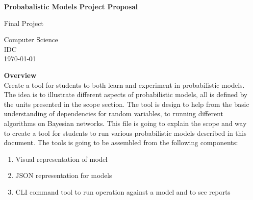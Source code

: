 \documentclass{article}
\begin{document}
    \begin{titlepage}
        \begin{center}
            \vspace*{1cm}
            
            \textbf{Probabalistic Models Project Proposal}
            
            \vspace{0.5cm}
            
            
            \vspace{1.5cm}
            
            \vfill
            
            Final Project\\
            
            \vspace{0.8cm}
            
            
            
            Computer Science\\
            IDC\\
            \today
            
        \end{center}
    \end{titlepage}

    \textbf{Overview}\\
    Create a tool for students to both learn and experiment in probabilistic models. The idea is to illustrate different aspects of probabilistic models, all is defined by the units presented in the scope section.
    The tool is design to help from the basic understanding of dependencies for random variables, to running different algorithms on Bayesian networks.
    This file is going to explain the scope and way to create a tool for students to run various probabilistic models described in this document. The tools is going to be assembled from the following components:
    \begin{enumerate}
        \item Visual representation of model
        \item JSON representation for models
        \item CLI command tool to run operation against a model and to see reports
    \end{enumerate}
\end{document}
